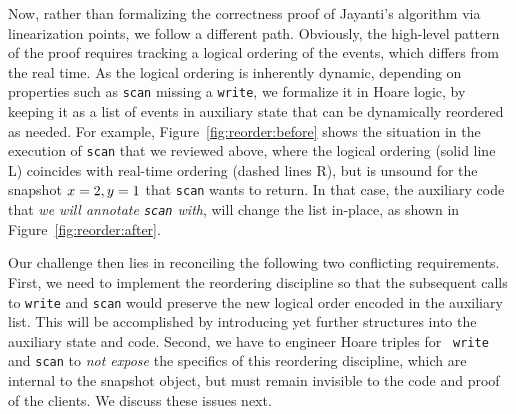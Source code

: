 Now, rather than formalizing the correctness proof of Jayanti's
algorithm via linearization points, we follow a different path.
Obviously, the high-level pattern of the proof requires tracking a
logical ordering of the events, which differs from the real time. As
the logical ordering is inherently dynamic, depending on properties
such as {\tt scan} missing a {\tt write}, we formalize it in Hoare
logic, by keeping it as a list of events in auxiliary state that can
be dynamically reordered as needed. For example,
Figure~\ref{fig:reorder:before} shows the situation in the execution
of {\tt scan} that we reviewed above, where the logical ordering
(solid line L) coincides with real-time ordering (dashed lines R), but
is unsound for the snapshot $x=2, y=1$ that {\tt scan} wants to
return. In that case, the auxiliary code that \emph{we will annotate
  {\tt scan} with}, will change the list in-place, as shown in
Figure~\ref{fig:reorder:after}.

Our challenge then lies in reconciling the following two conflicting
requirements. First, we need to implement the reordering discipline so
that the subsequent calls to {\tt write} and {\tt scan} would preserve
the new logical order encoded in the auxiliary list. This will be
accomplished by introducing yet further structures into the auxiliary
state and code. Second, we have to engineer Hoare triples for {\tt
  write} and {\tt scan} to \emph{not expose} the specifics of this
reordering discipline, which are internal to the snapshot object, but
must remain invisible to the code and proof of the clients. We discuss
these issues next.




